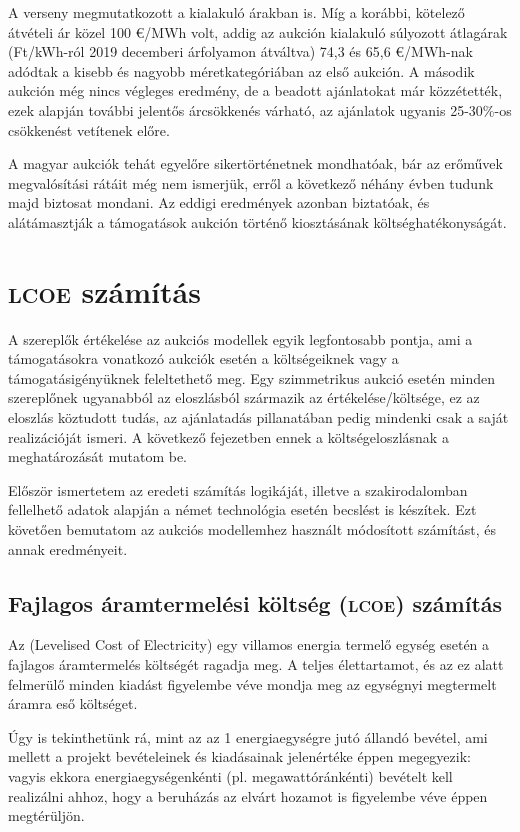 \documentclass[twoside, magyar, showtrims]{corvinusphd}
\theoremstyle{plain}
\theoremstyle{remark}
\theoremstyle{definition}
\begin{document}
A verseny megmutatkozott a kialakuló árakban is. Míg a korábbi,
kötelező átvételi ár közel 100 €/MWh volt, addig az aukción
kialakuló súlyozott átlagárak (Ft/kWh-ról 2019 decemberi árfolyamon átváltva)
74,3 és 65,6 €/MWh-nak adódtak a kisebb és nagyobb méretkategóriában
az első aukción. A második aukción még nincs végleges eredmény,
de a beadott ajánlatokat már közzétették, ezek alapján
további jelentős árcsökkenés várható, az ajánlatok ugyanis
25-30\%-os csökkenést vetítenek előre. 

A magyar aukciók tehát egyelőre sikertörténetnek mondhatóak,
bár az erőművek megvalósítási rátáit még nem ismerjük,
erről a következő néhány évben tudunk majd biztosat mondani.
Az eddigi eredmények azonban biztatóak,
és alátámasztják a támogatások aukción történő
kiosztásának költséghatékonyságát.

\chapter{\textsc{lcoe} számítás}

\scwords A szereplők értékelése az aukciós
modellek egyik legfontosabb pontja,
ami a támogatásokra vonatkozó aukciók esetén
a költségeiknek vagy a támogatásigényüknek feleltethető meg.
Egy szimmetrikus aukció esetén minden szereplőnek
ugyanabból az eloszlásból származik az értékelése/költsége,
ez az eloszlás köztudott tudás, az ajánlatadás pillanatában
pedig mindenki csak a saját realizációját ismeri.
A következő fejezetben ennek a
költségeloszlásnak a meghatározását mutatom be.

Először ismertetem az eredeti  számítás logikáját,
illetve a szakirodalomban fellelhető
adatok alapján a német  technológia esetén becslést is készítek.
Ezt követően bemutatom az aukciós
modellemhez használt módosított  számítást,
és annak eredményeit. 

\section{Fajlagos áramtermelési költség (\textsc{lcoe}) számítás}

Az  (Levelised Cost of Electricity)
egy villamos energia termelő egység esetén
a fajlagos áramtermelés költségét ragadja meg.
A teljes élettartamot,
és az ez alatt felmerülő minden kiadást figyelembe véve
mondja meg az egységnyi megtermelt áramra eső költséget.

Úgy is tekinthetünk rá, mint az az 1 energiaegységre jutó állandó bevétel,
ami mellett a projekt bevételeinek és kiadásainak jelenértéke éppen megegyezik:
vagyis ekkora energiaegységenkénti
(pl. megawattóránkénti) bevételt kell realizálni ahhoz,
hogy a beruházás az elvárt hozamot is figyelembe véve éppen megtérüljön.
\end{document}
